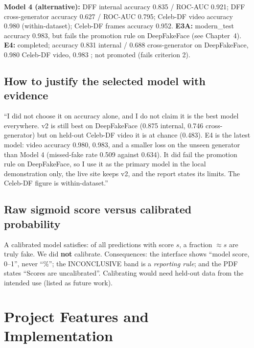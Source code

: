 \documentclass[11pt,a4paper]{report}
\newcommand{\code}[1]{\texttt{\detokenize{#1}}}
\begin{document}
\textbf{Model 4 (alternative):} DFF internal accuracy 0.835 / ROC-AUC 0.921; DFF cross-generator accuracy 0.627 / ROC-AUC 0.795; Celeb-DF video accuracy 0.980 (within-dataset); Celeb-DF frames accuracy 0.952.
\textbf{E3A:} modern\_test accuracy 0.983, but fails the promotion rule on DeepFakeFace (see Chapter~4).
\textbf{E4:} completed; accuracy 0.831 internal / 0.688 cross-generator on DeepFakeFace, 0.980 Celeb-DF video, 0.983 \code{modern_test}; not promoted (fails criterion 2).

\section{How to justify the selected model with evidence}
\begin{sayit}
``I did not choose it on accuracy alone, and I do not claim it is the best model everywhere. v2 is still best on DeepFakeFace (0.875 internal, 0.746 cross-generator) but on held-out Celeb-DF video it is at chance (0.483). E4 is the latest model: video accuracy 0.980, \code{modern\_test} 0.983, and a smaller loss on the unseen generator than Model 4 (missed-fake rate 0.509 against 0.634). It did fail the promotion rule on DeepFakeFace, so I use it as the primary model in the local demonstration only, the live site keeps v2, and the report states its limits. The Celeb-DF figure is within-dataset.''
\end{sayit}

\section{Raw sigmoid score versus calibrated probability}
A calibrated model satisfies: of all predictions with score $s$, a fraction $\approx s$ are truly fake. We did \textbf{not} calibrate. Consequences: the interface shows ``model score, 0--1'', never ``\%''; the INCONCLUSIVE band is a \emph{reporting rule}; and the PDF states ``Scores are uncalibrated''. Calibrating would need held-out data from the intended use (listed as future work).

\chapter{Project Features and Implementation}
\end{document}
